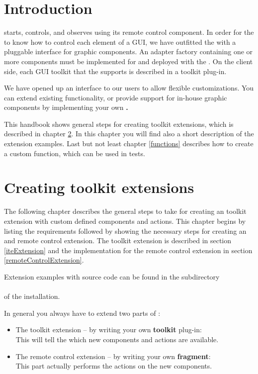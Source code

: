 \chapter{Introduction}
\label{introduction}

\app{} starts, controls, and observes \gdauts using its remote control component. In
order for the \gdagent to know how to control each element of a GUI, we have
outfitted the \gdagent with a pluggable interface for graphic components. An
adapter factory containing one or more components must be implemented for and
deployed with the \gdaut. On the client side, each GUI toolkit that the \ite{}
supports is described in a toolkit plug-in.

We have opened up an interface to our users to allow flexible
customizations. You can extend existing functionality, or provide support for
in-house graphic components by implementing your own \textbf{\gdtesterclasses.}

This handbook shows general steps for creating \ite{} toolkit extensions, which
is described in chapter \ref{toolkitExtension}. In this chapter you will find
also  a short description of the extension examples. Last but not least chapter
\ref{functions} describes how to create a custom \ite{} function, which can be
used in tests.

\chapter{Creating toolkit extensions}
\label{toolkitExtension}

The following chapter describes the general steps to take for creating an \ite{}
toolkit extension with custom defined components and actions. This chapter
begins by listing the requirements followed by showing the necessary steps
for creating an \ite{} and remote control extension. The \ite{} toolkit extension is
described in section \ref{iteExtension} and the implementation for the remote
control extension in section \ref{remoteControlExtension}.

Extension examples with source code can be found in the subdirectory\\
\\
of the \app{} installation.

In general you always have to extend two parts of \app{}:
\begin{itemize}
\item The \ite{} toolkit extension --  by writing your own \textbf{toolkit} plug-in:\\
      This will tell the \ite{} which new components and actions are
      available.
\item The remote control extension -- by writing your own \textbf{fragment}:\\
      This part actually performs the actions on the new components.
\end{itemize}

